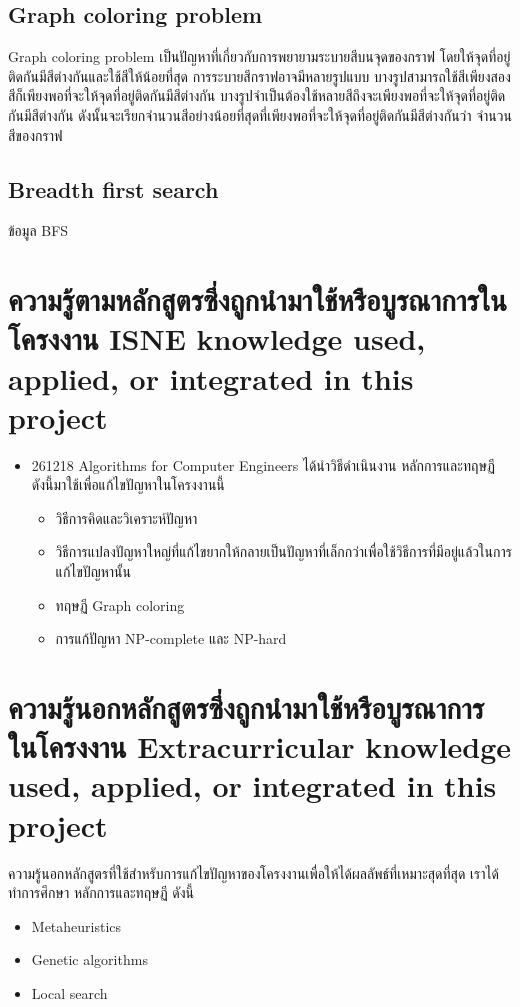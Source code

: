 \subsection{Graph coloring problem}
Graph coloring problem เป็นปัญหาที่เกี่ยวกับการพยายามระบายสีบนจุดของกราฟ โดยให้จุดที่อยู่ติดกันมีสีต่างกันและใช้สีให้น้อยที่สุด
การระบายสีกราฟอาจมีหลายรูปแบบ บางรูปสามารถใช้สีเพียงสองสีก็เพียงพอที่จะให้จุดที่อยู่ติดกันมีสีต่างกัน บางรูปจำเป็นต้องใช้หลายสีถึงจะเพียงพอที่จะให้จุดที่อยู่ติดกันมีสีต่างกัน 
ดังนั้นจะเรียกจำนวนสีอย่างน้อยที่สุดที่เพียงพอที่จะให้จุดที่อยู่ติดกันมีสีต่างกันว่า จำนวนสีของกราฟ
\subsection{Breadth first search}
ข้อมูล BFS

\section{\ifcpe%
ความรู้ตามหลักสูตรซึ่งถูกนำมาใช้หรือบูรณาการในโครงงาน
\else%
ISNE knowledge used, applied, or integrated in this project
\fi
}
\begin{itemize}
  \item 261218 Algorithms for Computer Engineers ได้นำวิธีดำเนินงาน หลักการและทฤษฏี ดังนี้มาใช้เพื่อแก้ไขปัญหาในโครงงานนี้  
  \begin{itemize}
  \item วิธีการคิดและวิเคราะห์ปัญหา
  \item วิธีการแปลงปัญหาใหญ่ที่แก้ไขยากให้กลายเป็นปัญหาที่เล็กกว่าเพื่อใช้วิธีการที่มีอยู่แล้วในการแก้ไขปัญหานั้น
  \item ทฤษฏี Graph coloring
  \item การแก้ปัญหา NP-complete และ NP-hard
  \end{itemize}
\end{itemize}

\section{\ifcpe%
ความรู้นอกหลักสูตรซึ่งถูกนำมาใช้หรือบูรณาการในโครงงาน
\else%
Extracurricular knowledge used, applied, or integrated in this project
\fi
}
ความรู้นอกหลักสูตรที่ใช้สำหรับการแก้ไขปัญหาของโครงงานเพื่อให้ได้ผลลัพธ์ที่เหมาะสุดที่สุด เราได้ทำการศึกษา หลักการและทฤษฏี ดังนี้
\begin{itemize}
  \item Meta­heuristics
  \item Genetic algorithms
  \item Local search
\end{itemize}
